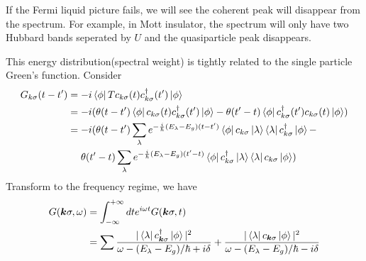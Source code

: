 \documentclass{article}
\begin{document}
If the Fermi liquid picture fails, we will see the coherent peak will disappear from the spectrum. For example, in Mott insulator, the spectrum will only have two Hubbard bands seperated by $U$ and the quasiparticle peak disappears.

This energy distribution(spectral weight) is tightly related to the single particle Green's function. Consider
\begin{align*}
    G_{k\sigma}(t-t')&=-i\bra{\phi}Tc_{k\sigma}(t)c_{k\sigma}^{\dagger}(t')\ket{\phi}\\
    &=-i(\theta(t-t')\bra{\phi}c_{k\sigma}(t)c^{\dagger}_{k\sigma}(t')\ket{\phi}-\theta(t'-t)\bra{\phi}c^{\dagger}_{k\sigma}(t')c_{k\sigma}(t)\ket{\phi})\\
     &= -i(\theta(t-t')\sum_{\lambda}e^{-\frac{i}{\hbar}(E_{\lambda}-E_g)(t-t')}\bra{\phi}c_{k\sigma}\ket{\lambda}\bra{\lambda}c_{k\sigma}^{\dagger}\ket{\phi}-\\
     &\quad\ \theta(t'-t)\sum_{\lambda}e^{-\frac{i}{\hbar}(E_{\lambda}-E_g)(t'-t)}\bra{\phi}c_{k\sigma}^{\dagger}\ket{\lambda}\bra{\lambda}c_{k\sigma}\ket{\phi})
\end{align*}
Transform to the frequency regime, we have
\begin{align*}
    G(\bm{k}\sigma,\omega)  &=  \int _{-\infty}^{+\infty} dt e^{i\omega t} G(\bm{k}\sigma,t) \\
    & = \sum \frac{|\bra{\lambda}c_{\bm{k}\sigma}^{\dagger}\ket{\phi}|^2}{\omega-(E_{\lambda}-E_g)/\hbar+i\delta} 
    + \frac{|\bra{\lambda}c_{\bm{k}\sigma}\ket{\phi}|^2}{\omega-(E_{\lambda}-E_{g})/\hbar-i\delta}
\end{align*}
\end{document}
